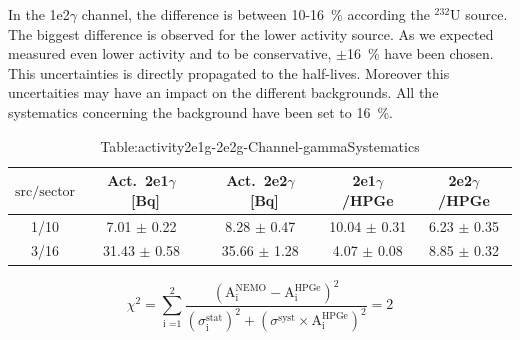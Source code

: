 \documentclass[main.tex]{subfiles}
\begin{document}
\bigskip

  In the 1e2$\gamma$ channel, the difference is between 10-16~\% according the $^{\text{232}}$U source. The biggest difference is observed for the lower activity source. As we expected measured even lower activity and to be conservative, $\pm$16~\% have been chosen. This uncertainties is directly propagated to the half-lives. Moreover this uncertaities may have an impact on the different backgrounds. All the systematics concerning the background have been set to 16~\%.


\bigskip

\begin{table}[h!]
\centering
\begin{tabular}{c|c|c|c|c}
$\text{src/sector}$ & Act.~2e1$\gamma$~[Bq] & Act.~2e2$\gamma$~[Bq] & 2e1$\gamma$/HPGe & 2e2$\gamma$/HPGe \\[0.1cm]
\toprule
1/10    & 7.01 $\pm$ 0.22 & 8.28 $\pm$ 0.47 & 10.04 $\pm$ 0.31 & 6.23 $\pm$ 0.35  \\[0.1cm]
3/16    & 31.43 $\pm$ 0.58 & 35.66 $\pm$ 1.28 & 4.07 $\pm$ 0.08 & 8.85 $\pm$ 0.32 \\[0.1cm]
\bottomrule
\end{tabular}
\label{vvv}
\caption{Table:activity2e1g-2e2g-Channel-gammaSystematics}
\end{table}
\bigskip



\begin{equation}
\chi^2 = \sum_{\text{i =1}}^{\text{2}} \frac{(\text{A}_\text{i}^{\text{NEMO}} - \text{A}_\text{i}^{\text{HPGe}})^\text{2}} {(\sigma_\text{i}^{\text{stat}})^\text{2} + (\sigma^{\text{syst}} \times \text{A}_\text{i}^{\text{HPGe}})^\text{2}} = \text{2}
\end{equation}
\end{document}
